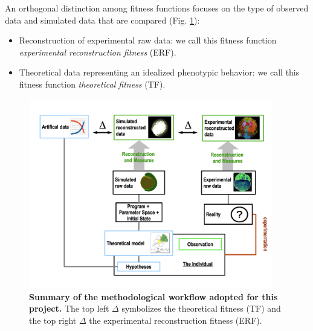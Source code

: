 An orthogonal distinction among fitness functions focuses on the type of observed data and simulated data that are compared (Fig. \ref{experimental_science_experimental_science_cleaner}):
\begin{itemize}
	\item Reconstruction of experimental raw data: we call this fitness function \textit{experimental reconstruction fitness} (ERF).
	\item Theoretical data representing an idealized phenotypic behavior: we call this fitness function \textit{theoretical fitness} (TF).
\end{itemize}
\begin{figure}
\begin{center}
\includegraphics[width=0.95\textwidth]{../../images/experimental_science/experimental_science_cleaner.png}
\end{center}
\caption{\textbf{Summary of the methodological workflow adopted for this project.} The top left $\Delta$ symbolizes the theoretical fitness (TF) and the top right $\Delta$ the experimental reconstruction fitness (ERF).}
\label{experimental_science_experimental_science_cleaner}
\end{figure}


